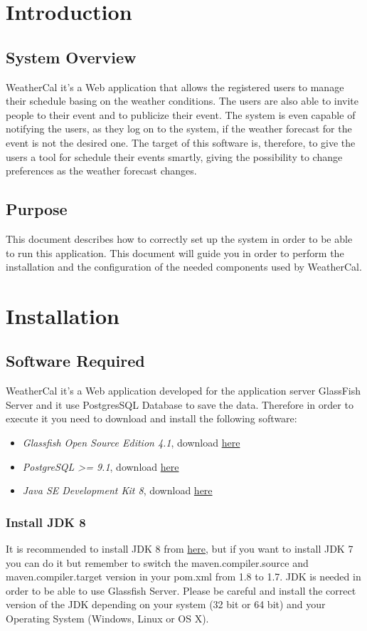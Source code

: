 \chapter{Introduction} \label{cap:cap1}
\section{System Overview}
WeatherCal  it's a Web application that allows the registered users to manage their schedule basing on the weather conditions. The users are also able to invite people to their event and to publicize their event. The system is even capable of notifying the users, as they log on to the system, if the weather forecast for the event is not the desired one. The target of this software is, therefore, to give the users a tool for schedule their events smartly, giving the possibility to change preferences as the weather forecast changes.
\section{Purpose}
This document describes how to correctly set up the system in order to be able to run this application. This document will guide you in order to perform the installation and the configuration of the needed components used  by WeatherCal.
\chapter{Installation}
\section{Software Required}
WeatherCal  it's a Web application developed for the application server GlassFish Server and it use PostgresSQL Database to save the data. Therefore in order to execute it you need to download and install the following software:
\begin{itemize}
\item {\it Glassfish Open Source Edition 4.1}, download \href{https://glassfish.java.net/download.html}{here}
\item  {\it PostgreSQL >= 9.1}, download \href{http://www.postgresql.org/download/}{here}
\item {\it Java SE Development Kit 8}, download  \href{http://www.oracle.com/technetwork/java/javase/downloads/jdk8-downloads-2133151.html}{here}

\end{itemize}
\subsection{Install JDK 8}
It is recommended to install JDK 8 from \href{http://www.oracle.com/technetwork/java/javase/downloads/jdk8-downloads-2133151.html}{here}, but if you want to install JDK 7 you can do it  but remember to switch the maven.compiler.source and maven.compiler.target version in your pom.xml from 1.8 to 1.7.
JDK is needed in order to be able to use Glassfish Server. 
Please be careful and install the correct version of the JDK depending on your system (32 bit or 64 bit) and your Operating System (Windows, Linux or OS X).
